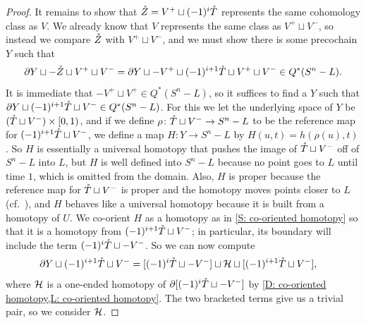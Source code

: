 \begin{proof}
	It remains to show that $\mathring{Z} = V^+ \sqcup (-1)^i\mathring{T}$ represents the same cohomology class as $V$.
	We already know that $V$ represents the same class as $V^+ \sqcup V^-$, so instead we compare $\mathring{Z}$ with $V^+ \sqcup V^-$, and we must show there is some precochain $Y$ such that
	$$\partial Y \sqcup -\mathring{Z}\sqcup V^+\sqcup V^- = \partial Y \sqcup -V^+ \sqcup (-1)^{i+1}\mathring{T} \sqcup V^+ \sqcup V^- \in Q^*(S^n-L).$$
	It is immediate that $-V^+ \sqcup V^+ \in Q^*(S^n-L)$, so it suffices to find a $Y$ such that
	$\partial Y \sqcup (-1)^{i+1} \mathring{T} \sqcup V^- \in Q^*(S^n-L)$.
	For this we let the underlying space of $Y$ be $(\mathring{T} \sqcup V^-) \times [0,1)$, and if we define $\rho \colon \mathring{T} \sqcup V^- \to S^n -L$ to be the reference map for $(-1)^{i+1}\mathring{T} \sqcup V^-$, we define a map $H \colon Y \to S^n-L$ by $H(u,t) = h(\rho(u),t)$.
	So $H$ is essentially a universal homotopy that pushes the image of $\mathring{T} \sqcup V^-$ off of $S^n-L$ into $L$, but $H$ is well defined into $S^n-L$ because no point goes to $L$ until time $1$, which is omitted from the domain.
	Also, $H$ is proper because the reference map for $\mathring{T} \sqcup V^-$ is proper and the homotopy moves points closer to $L$ (cf.\ \cite[Corollary I.10.3.7]{Bou98}), and $H$ behaves like a universal homotopy because it is built from a homotopy of $U$.
	We co-orient $H$ as a homotopy as in \cref{S: co-oriented homotopy} so that it is a homotopy from $(-1)^{i+1}\mathring{T} \sqcup V^-$; in particular, its boundary will include the term $(-1)^{i}\mathring{T} \sqcup - V^-$.
	So we can now compute
	\begin{align*}
		\partial Y \sqcup (-1)^{i+1} \mathring{T} \sqcup V^-
		&= [(-1)^{i}\mathring{T} \sqcup - V^-] \sqcup \mathcal{H} \sqcup [(-1)^{i+1} \mathring{T} \sqcup V^-],
	\end{align*}
	where $\mathcal{H}$ is a one-ended homotopy of $\partial[ (-1)^i\mathring{T} \sqcup - V^-]$ by \cref{D: co-oriented homotopy,L: co-oriented homotopy}.
	The two bracketed terms give us a trivial pair, so we consider
	$\mathcal{H}$.


\end{proof}
